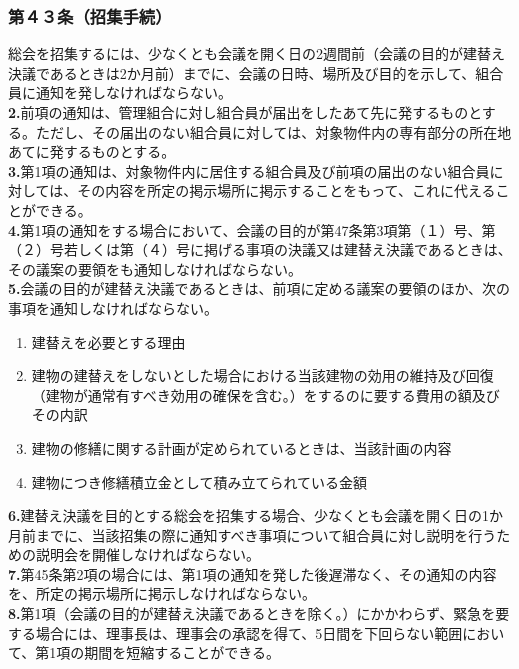 \documentclass[12pt,uplatex]{jsarticle}
\begin{document}
\subsubsection*{第４３条（招集手続）}
総会を招集するには、少なくとも会議を開く日の2週間前（会議の目的が建替え決議であるときは2か月前）までに、会議の日時、場所及び目的を示して、組合員に通知を発しなければならない。\\
\textbf{2.}前項の通知は、管理組合に対し組合員が届出をしたあて先に発するものとする。ただし、その届出のない組合員に対しては、対象物件内の専有部分の所在地あてに発するものとする。\\
\textbf{3.}第1項の通知は、対象物件内に居住する組合員及び前項の届出のない組合員に対しては、その内容を所定の掲示場所に掲示することをもって、これに代えることができる。\\
\textbf{4.}第1項の通知をする場合において、会議の目的が第47条第3項第（１）号、第（２）号若しくは第（４）号に掲げる事項の決議又は建替え決議であるときは、その議案の要領をも通知しなければならない。\\
\textbf{5.}会議の目的が建替え決議であるときは、前項に定める議案の要領のほか、次の事項を通知しなければならない。
\begin{enumerate}
\item 建替えを必要とする理由
\item 建物の建替えをしないとした場合における当該建物の効用の維持及び回復（建物が通常有すべき効用の確保を含む。）をするのに要する費用の額及びその内訳
\item 建物の修繕に関する計画が定められているときは、当該計画の内容
\item 建物につき修繕積立金として積み立てられている金額
\end{enumerate}
\textbf{6.}建替え決議を目的とする総会を招集する場合、少なくとも会議を開く日の1か月前までに、当該招集の際に通知すべき事項について組合員に対し説明を行うための説明会を開催しなければならない。\\
\textbf{7.}第45条第2項の場合には、第1項の通知を発した後遅滞なく、その通知の内容を、所定の掲示場所に掲示しなければならない。\\
\textbf{8.}第1項（会議の目的が建替え決議であるときを除く。）にかかわらず、緊急を要する場合には、理事長は、理事会の承認を得て、5日間を下回らない範囲において、第1項の期間を短縮することができる。\\
\end{document}
